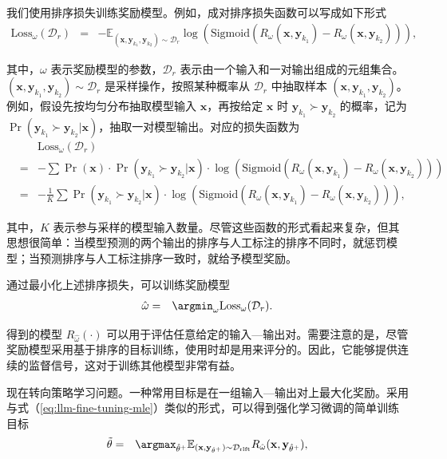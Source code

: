我们使用排序损失训练奖励模型。例如，成对排序损失函数可以写成如下形式
\begin{eqnarray}
\mathrm{Loss}_{\omega}(\mathcal{D}_r) & = & -\mathbb{E}_{(\mathbf{x},\mathbf{y}_{k_1},\mathbf{y}_{k_2}) \sim \mathcal{D}_r} \log(\mathrm{Sigmoid}(R_{\omega}(\mathbf{x},\mathbf{y}_{k_1}) - R_{\omega}(\mathbf{x},\mathbf{y}_{k_2}))),
\end{eqnarray}

\noindent 其中，$\omega$ 表示奖励模型的参数，$\mathcal{D}_r$ 表示由一个输入和一对输出组成的元组集合。$(\mathbf{x},\mathbf{y}_{k_1},\mathbf{y}_{k_2}) \sim \mathcal{D}_r$ 是采样操作，按照某种概率从 $\mathcal{D}_r$ 中抽取样本 $(\mathbf{x},\mathbf{y}_{k_1},\mathbf{y}_{k_2})$。例如，假设先按均匀分布抽取模型输入 $\mathbf{x}$，再按给定 $\mathbf{x}$ 时 $\mathbf{y}_{k_1} \succ \mathbf{y}_{k_2}$ 的概率，记为 $\Pr(\mathbf{y}_{k_1} \succ \mathbf{y}_{k_2} | \mathbf{x})$，抽取一对模型输出。对应的损失函数为
\begin{eqnarray}
&   & \mathrm{Loss}_{\omega}(\mathcal{D}_r) \nonumber \\
& = & -\sum \Pr(\mathbf{x}) \cdot \Pr(\mathbf{y}_{k_1} \succ \mathbf{y}_{k_2} | \mathbf{x}) \cdot \log(\mathrm{Sigmoid}(R_{\omega}(\mathbf{x},\mathbf{y}_{k_1}) - R_{\omega}(\mathbf{x},\mathbf{y}_{k_2}))) \nonumber \\
& = & -\frac{1}{K} \sum \Pr(\mathbf{y}_{k_1} \succ \mathbf{y}_{k_2} | \mathbf{x}) \cdot \log(\mathrm{Sigmoid}(R_{\omega}(\mathbf{x},\mathbf{y}_{k_1}) - R_{\omega}(\mathbf{x},\mathbf{y}_{k_2}))),
\end{eqnarray}

\noindent 其中，$K$ 表示参与采样的模型输入数量。尽管这些函数的形式看起来复杂，但其思想很简单：当模型预测的两个输出的排序与人工标注的排序不同时，就惩罚模型；当预测排序与人工标注排序一致时，就给予模型奖励。

通过最小化上述排序损失，可以训练奖励模型
\begin{eqnarray}
\hat{\omega} & = & \argmin_{\omega} \mathrm{Loss}_{\omega}(\mathcal{D}_r).
\end{eqnarray}


\noindent 得到的模型 $R_{\hat{\omega}}(\cdot)$ 可以用于评估任意给定的输入—输出对。需要注意的是，尽管奖励模型采用基于排序的目标训练，使用时却是用来评分的。因此，它能够提供连续的监督信号，这对于训练其他模型非常有益。

现在转向策略学习问题。一种常用目标是在一组输入—输出对上最大化奖励。采用与式（\ref{eq:llm-fine-tuning-mle}）类似的形式，可以得到强化学习微调的简单训练目标
\begin{eqnarray}
\tilde{\theta} & = & \argmax_{\hat{\theta}^+} \mathbb{E}_{(\mathbf{x},\mathbf{y}_{\hat{\theta}^+}) \sim \mathcal{D}_{\mathrm{rlft}}} R_{\hat{\omega}}(\mathbf{x},\mathbf{y}_{\hat{\theta}^+}),
\end{eqnarray}

